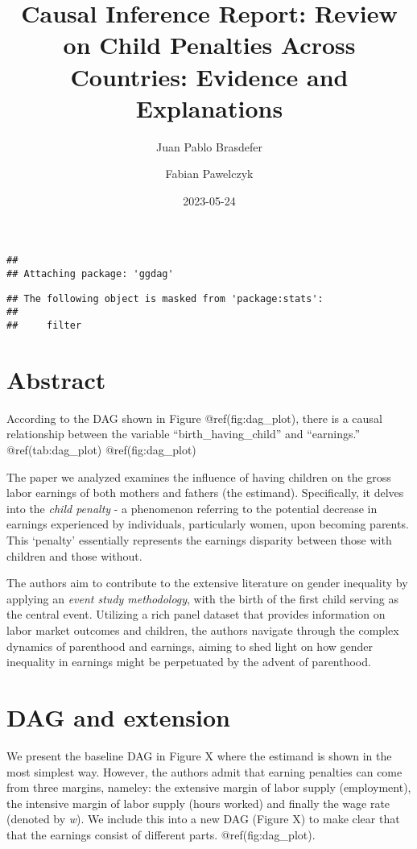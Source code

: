 \documentclass[
]{article}
\title{Causal Inference Report: Review on Child Penalties Across
Countries: Evidence and Explanations}
\author{Juan Pablo Brasdefer \and Fabian Pawelczyk}
\date{2023-05-24}
\begin{document}
\maketitle

\begin{verbatim}
## 
## Attaching package: 'ggdag'
\end{verbatim}

\begin{verbatim}
## The following object is masked from 'package:stats':
## 
##     filter
\end{verbatim}

\hypertarget{abstract}{%
\section{Abstract}\label{abstract}}

According to the DAG shown in Figure @ref(fig:dag\_plot), there is a
causal relationship between the variable ``birth\_having\_child'' and
``earnings.'' @ref(tab:dag\_plot) @ref(fig:dag\_plot)

The paper we analyzed examines the influence of having children on the
gross labor earnings of both mothers and fathers (the estimand).
Specifically, it delves into the \emph{child penalty} - a phenomenon
referring to the potential decrease in earnings experienced by
individuals, particularly women, upon becoming parents. This `penalty'
essentially represents the earnings disparity between those with
children and those without.

The authors aim to contribute to the extensive literature on gender
inequality by applying an \emph{event study methodology}, with the birth
of the first child serving as the central event. Utilizing a rich panel
dataset that provides information on labor market outcomes and children,
the authors navigate through the complex dynamics of parenthood and
earnings, aiming to shed light on how gender inequality in earnings
might be perpetuated by the advent of parenthood.

\hypertarget{dag-and-extension}{%
\section{DAG and extension}\label{dag-and-extension}}

We present the baseline DAG in Figure X where the estimand is shown in
the most simplest way. However, the authors admit that earning penalties
can come from three margins, nameley: the extensive margin of labor
supply (employment), the intensive margin of labor supply (hours worked)
and finally the wage rate (denoted by \emph{w}). We include this into a
new DAG (Figure X) to make clear that that the earnings consist of
different parts. @ref(fig:dag\_plot).
\end{document}
